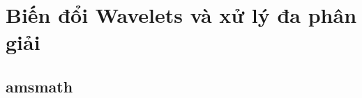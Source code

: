 \documentclass[12pt, a4paper]{report}
\begin{document}
\chapter{Biến đổi Wavelets và xử lý đa phân giải}
\section{amsmath}
\end{document}
